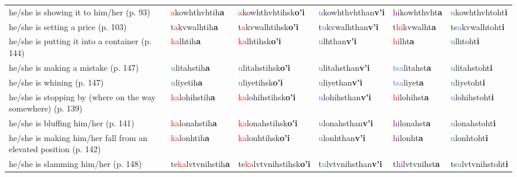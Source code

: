 \documentclass[oneside,openany]{book}%
\begin{document}
\begin{tabularx}{\textwidth}{>{\hsize=1.5\hsize\RaggedRight}X >{\hsize=0.9\hsize}X >{\hsize=0.9\hsize}X >{\hsize=0.9\hsize}X >{\hsize=0.9\hsize}X >{\hsize=0.9\hsize}X}
he/she is showing it to him/her (p. 93)&\textcolor{Red}{a}kowhthvhtih\textbf{a}&\textcolor{Red}{a}kowhthvhtihsk\textbf{o'i}&\textcolor{RoyalBlue}{u}kowhthvhthan\textbf{v'i}&\textcolor{Purple}{hi}kowhthvht\textbf{a}&\textcolor{RoyalBlue}{u}kowhthvhtoht\textbf{i}\\%
he/she is setting a price (p. 103)&t\textcolor{Red}{a}kvwalhtih\textbf{a}&t\textcolor{Red}{a}kvwalhtihsk\textbf{o'i}&t\textcolor{RoyalBlue}{u}kvwalhthan\textbf{v'i}&t\textcolor{Red}{hi}kvwalht\textbf{a}&ts\textcolor{RoyalBlue}{u}kvwalhtoht\textbf{i}\\%
he/she is putting it into a container (p. 144)&\textcolor{Red}{ka}lhtih\textbf{a}&\textcolor{Red}{ka}lhtihsk\textbf{o'i}&\textcolor{RoyalBlue}{u}lhthan\textbf{v'i}&\textcolor{Red}{hi}lht\textbf{a}&\textcolor{RoyalBlue}{u}lhtoht\textbf{i}\\%
he/she is making a mistake (p. 147)&\textcolor{RoyalBlue}{u}litahstih\textbf{a}&\textcolor{RoyalBlue}{u}litahstihsk\textbf{o'i}&\textcolor{RoyalBlue}{u}litahsthan\textbf{v'i}&\textcolor{RoyalBlue}{tsa}litahst\textbf{a}&\textcolor{RoyalBlue}{u}litahstoht\textbf{i}\\%
he/she is whining (p. 147)&\textcolor{RoyalBlue}{u}liyetih\textbf{a}&\textcolor{RoyalBlue}{u}liyetihsk\textbf{o'i}&\textcolor{RoyalBlue}{u}liyethan\textbf{v'i}&\textcolor{RoyalBlue}{tsa}liyet\textbf{a}&\textcolor{RoyalBlue}{u}liyetoht\textbf{i}\\%
he/she is stopping by (where on the way somewhere) (p. 139)&\textcolor{Red}{ka}lohihstih\textbf{a}&\textcolor{Red}{ka}lohihstihsk\textbf{o'i}&\textcolor{RoyalBlue}{u}lohihsthan\textbf{v'i}&\textcolor{Red}{hi}lohihst\textbf{a}&\textcolor{RoyalBlue}{u}lohihstoht\textbf{i}\\%
he/she is bluffing him/her (p. 141)&\textcolor{Red}{ka}lonahstih\textbf{a}&\textcolor{Red}{ka}lonahstihsk\textbf{o'i}&\textcolor{RoyalBlue}{u}lonahsthan\textbf{v'i}&\textcolor{Purple}{hi}lonahst\textbf{a}&\textcolor{RoyalBlue}{u}lonahstoht\textbf{i}\\%
he/she is making him/her fall from an elevated position (p. 142)&\textcolor{Red}{ka}lonhtih\textbf{a}&\textcolor{Red}{ka}lonhtihsk\textbf{o'i}&\textcolor{RoyalBlue}{u}lonhthan\textbf{v'i}&\textcolor{Purple}{hi}lonht\textbf{a}&\textcolor{RoyalBlue}{u}lonhtoht\textbf{i}\\%
he/she is slamming him/her (p. 148)&te\textcolor{Red}{ka}lvtvnihstih\textbf{a}&te\textcolor{Red}{ka}lvtvnihstihsk\textbf{o'i}&t\textcolor{RoyalBlue}{u}lvtvnihsthan\textbf{v'i}&t\textcolor{Purple}{hi}lvtvnihst\textbf{a}&ts\textcolor{RoyalBlue}{u}lvtvnihstoht\textbf{i}\\%

\end{tabularx}
\end{document}

